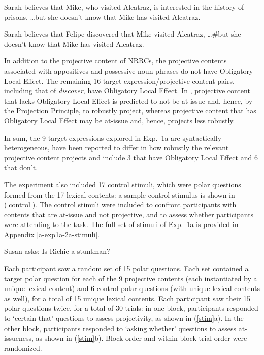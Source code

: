 \documentclass[11pt,fleqn]{article}
\newcommand{\6}{\mbox{$[\hspace*{-.6mm}[$}}
\newcommand{\9}{\mbox{$]\hspace*{-.6mm}]$}}
\begin{document}
\begin{enumerate}
\begin{exe}
\ex\label{ole}
\begin{xlist}
\ex Sarah believes that Mike, who visited Alcatraz, is interested in the history of prisons, \ldots but she doesn't know that Mike has visited Alcatraz.

\ex Sarah believes that Felipe discovered that Mike visited Alcatraz, \ldots \#but she doesn't know that Mike has visited Alcatraz. 

\end{xlist}
\end{exe}
In addition to the projective content of NRRCs, the projective contents associated with appositives and possessive noun phrases do not have Obligatory Local Effect. The remaining 16 target expression/projective content pairs, including that of {\em discover}, have Obligatory Local Effect. In \citealt[281]{brst-ar}, projective content that lacks Obligatory Local Effect is predicted to not be at-issue and, hence, by the Projection Principle, to robustly project, whereas projective content that has Obligatory Local Effect may be at-issue and, hence, projects less robustly.

\end{enumerate}

In sum, the 9 target expressions explored in Exp.~1a are syntactically heterogeneous, have been reported to differ in how robustly the relevant projective content projects and include 3 that have Obligatory Local Effect and 6 that don't.

The experiment also included 17 control stimuli, which were polar questions formed from the 17 lexical contents: a sample control stimulus is shown in (\ref{control}). The control stimuli were included to confront participants with contents that are at-issue and not projective, and to assess whether participants were attending to the task. The full set of stimuli of Exp.~1a is provided in Appendix \ref{a-exp1a-2a-stimuli}.

\begin{exe}
\ex\label{control} Susan asks: Is Richie a stuntman?
\end{exe}


Each participant saw a random set of 15 polar questions. Each set contained a target polar question for each of the 9 projective contents (each instantiated by a unique lexical content) and 6 control polar questions (with unique lexical contents as well), for a total of 15 unique lexical contents. Each participant saw their 15 polar questions twice, for a total of 30 trials: in one block, participants responded to `certain that' questions to assess projectivity, as shown in (\ref{stim}a). In the other block, participants responded to `asking whether' questions to assess at-issueness, as shown in (\ref{stim}b). Block order and within-block trial order were randomized.
\end{document}
